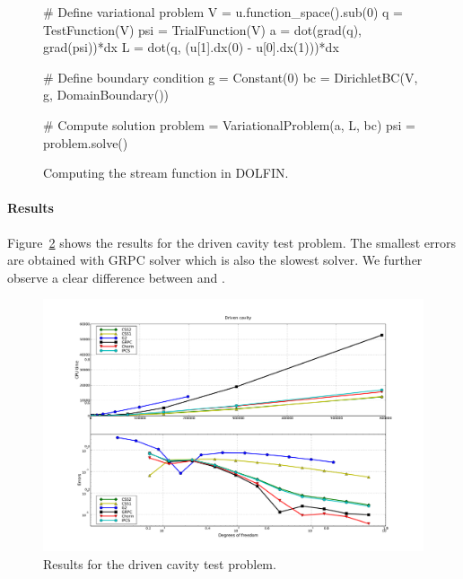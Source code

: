 \begin{figure}[htbp]
  \begin{center}
    \begin{python}
# Define variational problem
V   = u.function_space().sub(0)
q   = TestFunction(V)
psi = TrialFunction(V)
a   = dot(grad(q), grad(psi))*dx
L   = dot(q, (u[1].dx(0) - u[0].dx(1)))*dx

# Define boundary condition
g  = Constant(0)
bc = DirichletBC(V, g, DomainBoundary())

# Compute solution
problem = VariationalProblem(a, L, bc)
psi = problem.solve()
    \end{python}
    \caption{Computing the stream function in DOLFIN.}
    \label{fig:streamfunction}
  \end{center}
\end{figure}

\paragraph{Results}

Figure~\ref{fig:drivencavity_CPU_and_errors} shows the results for the
driven cavity test problem.  The smallest errors are obtained with
GRPC solver which is also the slowest solver. We further observe a
clear difference between  and .

\begin{figure}
  \begin{center}
    \includegraphics[width=14cm]{chapters/kvs-1/pdf/new_drivencavity_res.pdf}
  \end{center}
  \caption{Results for the driven cavity test problem.}
  \label{fig:drivencavity_CPU_and_errors}
\end{figure}

